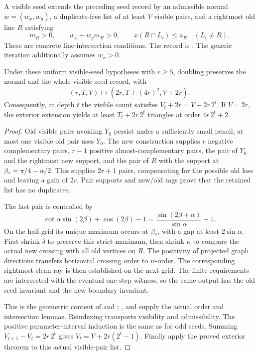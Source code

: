 A visible seed extends the preceding seed record by an admissible normal
$w=(w_x,w_y)$, a duplicate-free list of at least $V$ visible pairs, and a
rightmost old line $R$ satisfying
\[
 m_R>0,\qquad w_x+w_y m_R>0,
 \qquad x(R\cap L_i)\le a_R \quad(L_i\ne R).
\]
These are concrete line-intersection conditions. The record is
. The generic
iteration additionally assumes $w_x>0$.

\begin{theorem}\label{fam:visible-iteration}
Under these uniform visible-seed hypotheses with $r\ge5$, doubling
preserves the normal and the whole visible-seed record, with
\begin{equation}
 (r,T,V)\longmapsto(2r,T+(4r)^2,V+2r).
 \label{fam:visible-step}
\end{equation}
Consequently, at depth $t$ the visible count satisfies
$V_t+2r=V+2r\,2^t$. If $V=2r$, the exterior extension yields at least
$T_t+2r\,2^t$ triangles at order $4r\,2^t+2$.
\end{theorem}

\begin{proof}
Old visible pairs avoiding $Y_0$ persist under a sufficiently small
pencil; at most one visible old pair uses $Y_0$. The new construction
supplies $r$ negative complementary pairs, $r-1$ positive
almost-complementary pairs, the pair of $Y_0$ and the rightmost new
support, and the pair of $R$ with the support at
$\beta_* =\pi/4-\alpha/2$. This supplies $2r+1$ pairs, compensating for
the possible old loss and leaving a gain of $2r$. Pair supports and
new/old tags prove that the retained list has no duplicates.

The last pair is controlled by
\[
 \cot\alpha\sin(2\beta)+\cos(2\beta)-1
   =\frac{\sin(2\beta+\alpha)}{\sin\alpha}-1.
\]
On the half-grid its unique maximum occurs at $\beta_*$, with a gap
at least $2\sin\alpha$. First shrink $\delta$ to preserve this strict
maximum, then shrink $\kappa$ to compare the actual new crossing with
all old vertices on $R$. The positivity of projected graph directions
transfers horizontal crossing order to $w$-order. The corresponding
rightmost clean ray is then established on the next grid. The finite
requirements are intersected with the eventual one-step witness, so the
same output has the old seed invariant and the new boundary invariant.

This is the geometric content of
and ;
,  and
 supply the actual order and intersection lemmas.
Reindexing transports visibility and admissibility. The positive
parameter-interval induction is the same as for odd seeds. Summing
$V_{t+1}-V_t=2r\,2^t$ gives $V_t=V+2r(2^t-1)$. Finally apply the
proved exterior theorem to this actual visible-pair list.
\end{proof}

